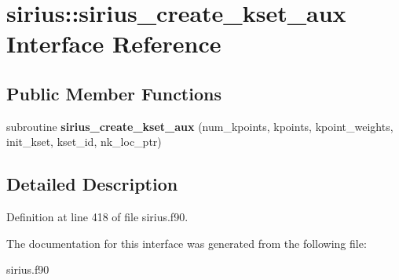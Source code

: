 \hypertarget{interfacesirius_1_1sirius__create__kset__aux}{}\section{sirius\+:\+:sirius\+\_\+create\+\_\+kset\+\_\+aux Interface Reference}
\label{interfacesirius_1_1sirius__create__kset__aux}
\subsection*{Public Member Functions}
\begin{DoxyCompactItemize}
\item 
\hypertarget{interfacesirius_1_1sirius__create__kset__aux_a41e8e5ab7950e82fa4be9bc3f3e5a71a}{}subroutine {\bfseries sirius\+\_\+create\+\_\+kset\+\_\+aux} (num\+\_\+kpoints, kpoints, kpoint\+\_\+weights, init\+\_\+kset, kset\+\_\+id, nk\+\_\+loc\+\_\+ptr)\label{interfacesirius_1_1sirius__create__kset__aux_a41e8e5ab7950e82fa4be9bc3f3e5a71a}

\end{DoxyCompactItemize}


\subsection{Detailed Description}


Definition at line 418 of file sirius.\+f90.



The documentation for this interface was generated from the following file\+:\begin{DoxyCompactItemize}
\item 
sirius.\+f90\end{DoxyCompactItemize}
